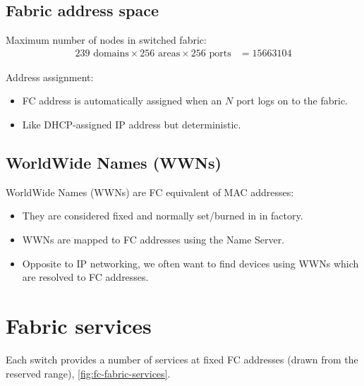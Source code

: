 \documentclass[slides]{pgnotes}
\begin{document}

\subsection{Fabric address space}

Maximum number of nodes in switched fabric:
\begin{align}
  \mbox{239 domains} \times \mbox{256 areas} \times \mbox{256 ports} & = 15663104 \label{eq:max-number-of-nodes-switched-fabric}
\end{align}

Address assignment:
\begin{itemize}
\item FC address is automatically assigned when an \(N\) port logs on to the fabric.
\item Like DHCP-assigned IP address but deterministic.
\end{itemize}

\subsection{WorldWide Names (WWNs)}
\label{sec:wwn}

WorldWide Names (WWNs) are FC equivalent of MAC addresses:
\begin{itemize}
\item They are considered fixed and normally set/burned in in factory.
\item WWNs are mapped to FC addresses using the Name Server.
\item Opposite to IP networking, we often want to find devices using WWNs which are resolved
to FC addresses.
\end{itemize}



\section{Fabric services}
\label{sec:fabric-services}

Each switch provides a number of services at fixed FC addresses (drawn from the reserved range), \autoref{fig:fc-fabric-services}.
\end{document}

